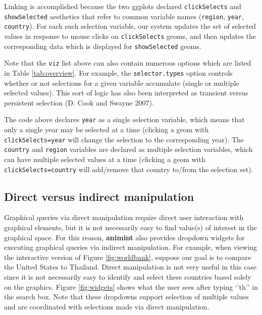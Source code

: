 \documentclass[12pt,]{article}
\newenvironment{Shaded}{\begin{snugshade}}{\end{snugshade}}
\newcommand{\DataTypeTok}[1]{\textcolor[rgb]{0.13,0.29,0.53}{#1}}
\newcommand{\KeywordTok}[1]{\textcolor[rgb]{0.13,0.29,0.53}{\textbf{#1}}}
\newcommand{\NormalTok}[1]{#1}
\newcommand{\OperatorTok}[1]{\textcolor[rgb]{0.81,0.36,0.00}{\textbf{#1}}}
\newcommand{\StringTok}[1]{\textcolor[rgb]{0.31,0.60,0.02}{#1}}
\theoremstyle{definition}
\theoremstyle{definition}
\theoremstyle{definition}
\theoremstyle{remark}
\begin{document}
Linking is accomplished because the two ggplots declared
\texttt{clickSelects} and \texttt{showSelected} aesthetics that refer to
common variable names (\texttt{region}, \texttt{year},
\texttt{country}). For each such selection variable, our system updates
the set of selected values in response to mouse clicks on
\texttt{clickSelects} geoms, and then updates the corresponding data
which is displayed for \texttt{showSelected} geoms.

Note that the \texttt{viz} list above can also contain numerous options
which are listed in Table \ref{tab:overview}. For example, the
\texttt{selector.types} option controls whether or not selections for a
given variable accumulate (single or multiple selected values). This
sort of logic has also been interpreted as transient versus persistent
selection (D. Cook and Swayne 2007).

\begin{Shaded}
\end{Shaded}

The code above declares \texttt{year} as a single selection variable,
which means that only a single year may be selected at a time (clicking
a geom with \texttt{clickSelects=year} will change the selection to the
corresponding year). The \texttt{country} and \texttt{region} variables
are declared as multiple selection variables, which can have multiple
selected values at a time (clicking a geom with
\texttt{clickSelects=country} will add/remove that country to/from the
selection set).

\hypertarget{direction}{%
\subsection{Direct versus indirect manipulation}\label{direction}}

Graphical queries via direct manipulation require direct user
interaction with graphical elements, but it is not necessarily easy to
find value(s) of interest in the graphical space. For this reason,
\textbf{animint} also provides dropdown widgets for executing graphical
queries via indirect manipulation. For example, when viewing the
interactive version of Figure \ref{fig:worldbank}, suppose our goal is
to compare the United States to Thailand. Direct manipulation is not
very useful in this case since it is not necessarily easy to identify
and select these countries based solely on the graphics. Figure
\ref{fig:widgets} shows what the user sees after typing `'th'' in the
search box. Note that these dropdowns support selection of multiple
values and are coordinated with selections made via direct manipulation.
\end{document}
